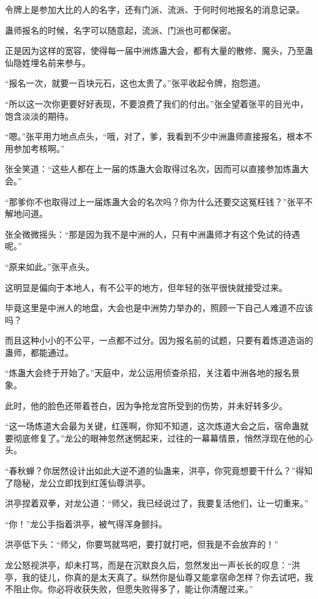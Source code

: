 \begin{this_body}
令牌上是参加大比的人的名字，还有门派、流派、于何时何地报名的消息记录。

蛊师报名的时候，名字可以随意起，流派、门派也可都保密。

正是因为这样的宽容，使得每一届中洲炼蛊大会，都有大量的散修、魔头，乃至蛊仙隐姓埋名前来参与。

“报名一次，就要一百块元石，这也太贵了。”张平收起令牌，抱怨道。

“所以这一次你更要好好表现，不要浪费了我们的付出。”张全望着张平的目光中，饱含淡淡的期待。

“嗯。”张平用力地点点头，“哦，对了，爹，我看到不少中洲蛊师直接报名，根本不用参加考核啊。”

张全笑道：“这些人都在上一届的炼蛊大会取得过名次，因而可以直接参加炼蛊大会。”

“那爹你不也取得过上一届炼蛊大会的名次吗？你为什么还要交这冤枉钱？”张平不解地问道。

张全微微摇头：“那是因为我不是中洲的人，只有中洲蛊师才有这个免试的待遇呢。”

“原来如此。”张平点头。

这明显是偏向于本地人，有不公平的地方，但年轻的张平很快就接受过来。

毕竟这里是中洲人的地盘，大会也是中洲势力举办的，照顾一下自己人难道不应该吗？

而且这种小小的不公平，一点都不过分。因为报名前的试题，只要有着炼道造诣的蛊师，都能通过。

“炼蛊大会终于开始了。”天庭中，龙公运用侦查杀招，关注着中洲各地的报名景象。

此时，他的脸色还带着苍白，因为争抢龙宫所受到的伤势，并未好转多少。

“这一场炼道大会最为关键，红莲啊，你知不知道，这次炼道大会之后，宿命蛊就要彻底修复了。”龙公的眼神忽然迷惘起来，过往的一幕幕情景，悄然浮现在他的心头。

“春秋蝉？你居然设计出如此大逆不道的仙蛊来，洪亭，你究竟想要干什么？”得知了隐秘，龙公立即找到红莲仙尊洪亭。

洪亭捏着双拳，对龙公道：“师父，我已经说过了，我要复活他们，让一切重来。”

“你！”龙公手指着洪亭，被气得浑身颤抖。

洪亭低下头：“师父，你要骂就骂吧，要打就打吧，但我是不会放弃的！”

龙公怒视洪亭，却未打骂，而是在沉默良久后，忽然发出一声长长的叹息：“洪亭，我的徒儿，你真的是太天真了。纵然你是仙尊又能拿宿命怎样？你去试吧，我不阻止你。你必将收获失败，但愿失败得多了，能让你清醒过来。”


\end{this_body}
